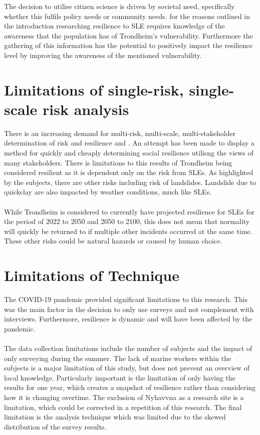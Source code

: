 The decision to utilise citizen science is driven by societal need, specifically whether this fulfils policy needs or community needs. for the reasons outlined in the introduction researching resilience to SLE requires knowledge of the awareness that the population has of Trondheim's vulnerability. Furthermore the gathering of this information has the potential to positively impact the resilience level by improving the awareness of the mentioned vulnerability. 


\section{Limitations of single-risk, single-scale risk analysis}
There is an increasing demand for multi-risk, multi-scale, multi-stakeholder determination of risk and resilience \cite{gerkensmeier_governing_2018} and \cite{cutter_community_2020}. An attempt has been made to display a method for quickly and cheaply determining social resilience utilisng the views of many stakeholders. There is limitations to this results of Trondheim being considered resilient as it is dependent only on the risk from SLEs. As highlighted by the subjects, there are other risks including risk of landslides. Landslide due to quickclay are also impacted by weather conditions, much like SLEs. 
\paragraph{}

While Trondheim is considered to currently have projected resilience for SLEs for the period of 2022 to 2050 and 2050 to 2100, this does not mean that normality will quickly be returned to if multiple other incidents occurred at the same time. These other risks could be natural hazards or caused by human choice. 

\section{Limitations of Technique}
The COVID-19 pandemic provided significant limitations to this research. This was the main factor in the decision to only use surveys and not complement with interviews. Furthermore, resilience is dynamic and will have been affected by the pandemic. 
\paragraph{}
The data collection limitations include the number of subjects and the impact of only surveying during the summer. The lack of marine workers within the subjects is a major limitation of this study, but does not prevent an overview of local knowledge. Particularly important is the limitation of only having the results for one year, which creates a snapshot of resilience rather than considering how it is changing overtime.  The exclusion of Nyhavvna as a research site is a limitation, which could be corrected in a repetition of this research.  The final limitation is the analysis technique which was limited due to the skewed distribution of the survey results.

